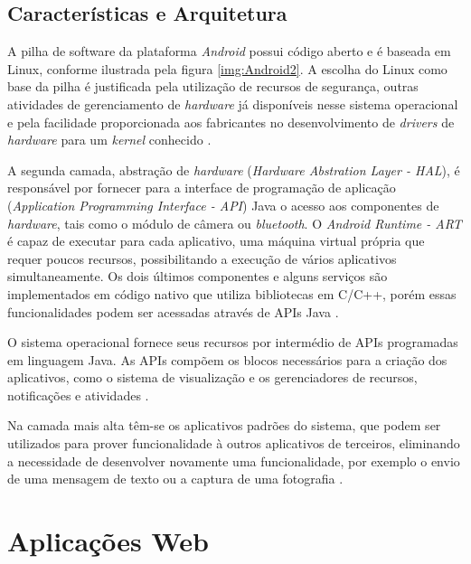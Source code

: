 \subsection{Características e Arquitetura}

A pilha de software da plataforma \textit{Android} possui código aberto e é baseada em Linux, conforme ilustrada pela figura \ref{img:Android2}. A escolha do Linux como base da pilha é justificada pela utilização de recursos de segurança, outras atividades de gerenciamento de \textit{hardware} já disponíveis nesse sistema operacional e pela facilidade proporcionada aos fabricantes no desenvolvimento de \textit{drivers} de \textit{hardware} para um \textit{kernel} conhecido \cite{SITEANDROID, gandhewar2010google}.


A segunda camada, abstração de \textit{hardware} (\textit{Hardware Abstration Layer - HAL}), é responsável por fornecer para a interface de programação de aplicação (\textit{Application Programming Interface - API}) Java o acesso aos componentes de \textit{hardware}, tais como o módulo de câmera ou \textit{bluetooth}. O \textit{Android Runtime - ART} é capaz de executar para cada aplicativo, uma máquina virtual própria que requer poucos recursos, possibilitando a execução de vários aplicativos simultaneamente. Os dois últimos componentes e alguns serviços são implementados em código nativo que utiliza bibliotecas em C/C++, porém essas funcionalidades podem ser acessadas através de APIs Java \cite{SITEANDROID}.

O sistema operacional fornece seus recursos por intermédio de APIs programadas em linguagem Java. As APIs compõem os blocos necessários para a criação dos aplicativos, como o sistema de visualização e os gerenciadores de recursos, notificações e atividades \cite{SITEANDROID}.

Na camada mais alta têm-se os aplicativos padrões do sistema, que podem ser utilizados para prover funcionalidade à outros aplicativos de terceiros, eliminando a necessidade de desenvolver novamente uma funcionalidade, por exemplo o envio de uma mensagem de texto ou a captura de uma fotografia \cite{SITEANDROID, saha2008developer}.

\section{Aplicações Web}

